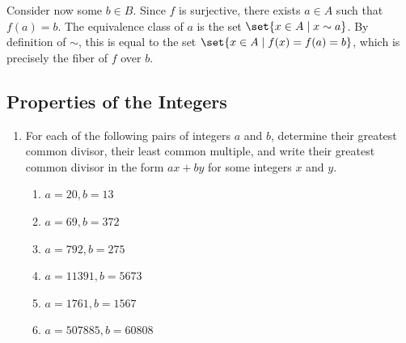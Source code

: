 \begin{problems}
\begin{sol}
        Consider now some $b \in B$. Since $f$ is surjective, there exists $a \in A$ such that $f(a) = b$. The equivalence class of $a$ is the set $\set{x \in A \mid x \sim a}$. By definition of $\sim$, this is equal to the set $\set{x \in A \mid f(x) = f(a) = b}$, which is precisely the fiber of $f$ over $b$.
    \end{sol}
\end{problems}

\subsection{Properties of the Integers}

\begin{enumerate}
    \item For each of the following pairs of integers $a$ and $b$, determine their greatest common divisor, their least common multiple, and write their greatest common divisor in the form $ax + by$ for some integers $x$ and $y$.
    \begin{enumerate}
        \item $a = 20, b = 13$
        \item $a= 69, b = 372$
        \item $a = 792, b = 275$
        \item $a = 11391, b = 5673$
        \item $a= 1761, b = 1567$
        \item $a = 507885, b = 60808$
    \end{enumerate}
\end{enumerate}
